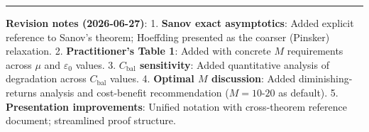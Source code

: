 \documentclass[
  12pt,
]{ctexart}
\begin{document}
\begin{center}\rule{0.5\linewidth}{0.5pt}\end{center}

\textbf{Revision notes (2026-06-27)}: 1. \textbf{Sanov exact
asymptotics}: Added explicit reference to Sanov's theorem; Hoeffding
presented as the coarser (Pinsker) relaxation. 2. \textbf{Practitioner's
Table 1}: Added with concrete \(M\) requirements across \(\mu\) and
\(\varepsilon_0\) values. 3. \textbf{\(C_{\text{bal}}\) sensitivity}:
Added quantitative analysis of degradation across \(C_{\text{bal}}\)
values. 4. \textbf{Optimal \(M\) discussion}: Added diminishing-returns
analysis and cost-benefit recommendation (\(M=10\text{-}20\) as
default). 5. \textbf{Presentation improvements}: Unified notation with
cross-theorem reference document; streamlined proof structure.
\end{document}
